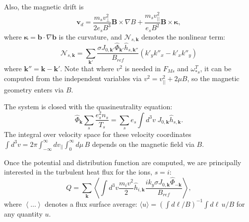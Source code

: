 \documentclass{jpp}
\begin{document}
Also, the magnetic drift is
\begin{equation}
\label{eq:v_drift}
\mathbf{v}_d = \frac{m_s v_{\perp}^2}{2 e_s B^3} \mathbf{B}\times\nabla B
+ \frac{m_s v_{||}^2}{e_s B^2} \mathbf{B}\times\mathbf{\kappa},
\end{equation}
where $\mathbf{\kappa}=\mathbf{b}\cdot\nabla\mathbf{b}$ is the curvature, and $\mathcal{N}_{s,\mathbf{k}}$ denotes the nonlinear term:
\begin{equation}
    \mathcal{N}_{s,\mathbf{k}}=
    \sum_{\mathbf{k}'}
    \frac{\sigma J_{0,\mathbf{k'}} \hat{\Phi}_{\mathbf{k}'} \hat{h}_{s,\mathbf{k}''}}{B_{ref}}
    (k'_y k''_x - k'_x k''_y)
\end{equation}
where $\mathbf{k}''=\mathbf{k} - \mathbf{k}'$.
Note that where $v^2$ is needed in $F_{Ms}$ and $\omega_{*s}^T$, it can be computed from the independent variables via $v^2=v_{||}^2+2\mu B$, so the magnetic geometry enters via $B$.


The system is closed with the quasineutrality equation:
\begin{equation}
\hat{\Phi}_{\mathbf{k}}
\sum_s \frac{e_s^2 n_s }{T_s}
=    \sum_s e_s \int d^3v \; J_{0,\mathbf{k}}  \hat{h}_{s,\mathbf{k}} .
\end{equation}
The integral over velocity space for these velocity coordinates $\int d^3v = 2\pi \int_{-\infty}^{\infty} dv_{||} \int_0^{\infty} d\mu \,B$ depends on the magnetic field via $B$.

Once the potential and distribution function are computed, we are principally interested in the turbulent heat flux for the ions, $s=i$:
\begin{equation}
    Q = \sum_{\mathbf{k}}
    \left\langle \int d^3v \frac{m_i v^2}{2}
    \hat{h}_{i,\mathbf{k}} \frac{i k_y \sigma J_{0,\mathbf{k}} \hat{\Phi}_{-\mathbf{k}}}{B_{ref}}
    \right\rangle,
\end{equation}
where $\left \langle\ldots\right\rangle$ denotes a flux surface average: $\langle u \rangle = \left(\int d\ell/B\right)^{-1} \int d\ell\, u/B$ for any quantity $u$.
\end{document}
